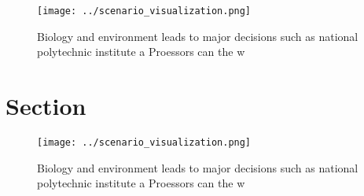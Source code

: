 \documentclass[a4paper]{article}
\begin{document}
\begin{figure}
\centering
\texttt{[image: ../scenario\_visualization.png]}
\caption{Biology and environment leads to major decisions such as national polytechnic institute a Proessors can the w
}
\end{figure}
 
\section{Section}

\begin{figure}
\centering
\texttt{[image: ../scenario\_visualization.png]}
\caption{Biology and environment leads to major decisions such as national polytechnic institute a Proessors can the w
}
\end{figure}
 
\end{document}
